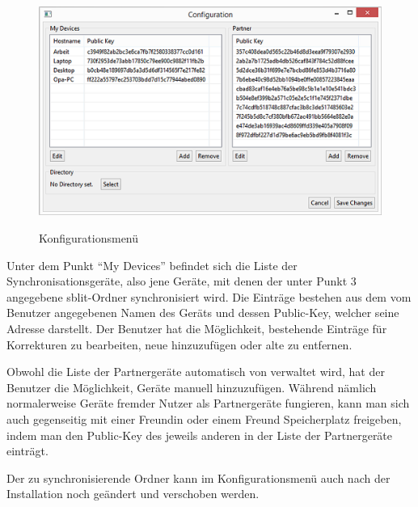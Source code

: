 \begin{figure}[H]
	\centering
	\includegraphics[]{images/config_gui.jpg}
	\label{config_gui}
  \caption{Konfigurationsmenü}
\end{figure}
\begin{description}

		Unter dem Punkt “My Devices” befindet sich die Liste der
		Synchronisationsgeräte, also jene Geräte, mit denen der unter Punkt 3
		angegebene sblit-Ordner synchronisiert wird. Die Einträge
		bestehen aus dem vom Benutzer angegebenen Namen des Geräts und dessen
		Public-Key, welcher seine Adresse darstellt. Der Benutzer hat die
		Möglichkeit, bestehende Einträge für Korrekturen zu bearbeiten, neue
		hinzuzufügen oder alte zu entfernen.

		Obwohl die Liste der Partnergeräte automatisch von \sblit verwaltet wird,
		hat der Benutzer die Möglichkeit, Geräte manuell hinzuzufügen. Während
		nämlich normalerweise Geräte fremder Nutzer als Partnergeräte fungieren,
		kann man sich auch gegenseitig mit einer Freundin oder einem Freund
		Speicherplatz freigeben, indem man den Public-Key des jeweils anderen in der
		Liste der Partnergeräte einträgt.

		Der zu synchronisierende Ordner kann im Konfigurationsmenü auch nach der
		Installation noch geändert und verschoben werden.

\end{description}
